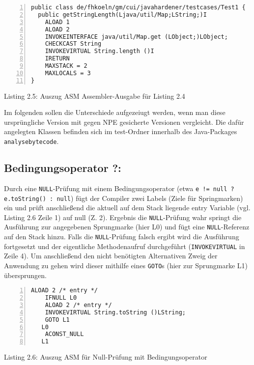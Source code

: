 \vspace{0.3cm}


\begin{lstlisting}[basicstyle=\ttfamily,numbers=left,numberstyle=\footnotesize\ttfamily,backgroundcolor=\color{source}]
public class de/fhkoeln/gm/cui/javahardener/testcases/Test1 {
  public getStringLength(Ljava/util/Map;LString;)I
    ALOAD 1
    ALOAD 2
    INVOKEINTERFACE java/util/Map.get (LObject;)LObject;
    CHECKCAST String
    INVOKEVIRTUAL String.length ()I
    IRETURN
    MAXSTACK = 2
    MAXLOCALS = 3
}
\end{lstlisting}
\centerline{Listing 2.5: Auszug ASM Assembler-Ausgabe für Listing 2.4}

\vspace{0.3cm}

Im folgenden sollen die Unterschiede aufgezeiugt werden, wenn man diese ursprüngliche
Version mit gegen NPE gesicherte Versionen vergleicht. Die dafür angelegten Klassen
befinden sich im test-Ordner innerhalb des Java-Packages \texttt{analysebytecode}.

\vspace{0.3cm}


\subsection{Bedingungsoperator ?:}

Durch eine \texttt{NULL}-Prüfung mit einem Bedingungsoperator
(etwa \texttt{e != null ? e.toString() : null})
fügt der Compiler zwei Labels (Ziele für Springmarken) ein und prüft
anschließend die aktuell auf dem Stack liegende entry Variable (vgl. Listing 2.6 Zeile 1)
auf null (Z. 2). Ergebnis die \texttt{NULL}-Prüfung wahr springt die Ausführung
zur angegebenen Sprungmarke (hier L0) und fügt eine \texttt{NULL}-Referenz auf den Stack hinzu.
Falls die \texttt{NULL}-Prüfung falsch ergibt wird die Ausführung fortgesetzt
und der eigentliche Methodenaufruf durchgeführt (\texttt{INVOKEVIRTUAL} in Zeile 4).
Um anschließend den nicht benötigten Alternativen Zweig der Anwendung zu gehen wird
dieser mithilfe eines \texttt{GOTO}s (hier zur Sprungmarke L1) übersprungen.

\begin{lstlisting}[basicstyle=\ttfamily,numbers=left,numberstyle=\footnotesize\ttfamily,backgroundcolor=\color{source}]
    ALOAD 2 /* entry */
    IFNULL L0
    ALOAD 2 /* entry */
    INVOKEVIRTUAL String.toString ()LString;
    GOTO L1
   L0
    ACONST_NULL
   L1
\end{lstlisting}
\centerline{Listing 2.6: Auszug ASM für Null-Prüfung mit Bedingungsoperator}

